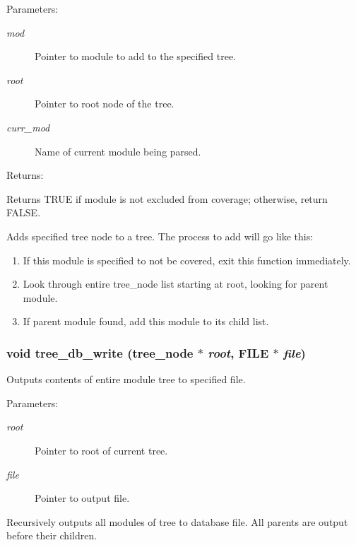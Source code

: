 \begin{Desc}
\item[Parameters: ]\par
\begin{description}
\item[{\em 
mod}]Pointer to module to add to the specified tree. \item[{\em 
root}]Pointer to root node of the tree. \item[{\em 
curr\_\-mod}]Name of current module being parsed. \end{description}
\end{Desc}
\begin{Desc}
\item[Returns: ]\par
Returns TRUE if module is not excluded from coverage; otherwise, return FALSE.\end{Desc}
Adds specified tree node to a tree. The process to add will go like this:\begin{enumerate}
\item 
If this module is specified to not be covered, exit this function immediately.\item 
Look through entire tree\_\-node list starting at root, looking for parent module.\item 
If parent module found, add this module to its child list. \end{enumerate}
\subsubsection{\setlength{\rightskip}{0pt plus 5cm}void tree\_\-db\_\-write ({\bf tree\_\-node} $\ast$ {\em root}, FILE $\ast$ {\em file})}\label{tree_8c_a4}


Outputs contents of entire module tree to specified file.

\begin{Desc}
\item[Parameters: ]\par
\begin{description}
\item[{\em 
root}]Pointer to root of current tree. \item[{\em 
file}]Pointer to output file.\end{description}
\end{Desc}
Recursively outputs all modules of tree to database file. All parents are output before their children. 
